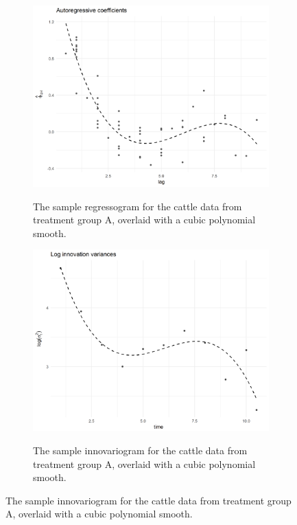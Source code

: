 \documentclass[12pt]{article}
\theoremstyle{definition}
\begin{document}
\begin{figure}[H]
  \begin{subfigure}[t]{0.45\textwidth}
\centering
\includegraphics[width = \textwidth]{img/cattle/cattleA-regressogram-with-cubic-smooth}
\label{fig:cattleA-regressogram-cubic-smooth}
\caption{The sample regressogram for the cattle data from treatment group A, overlaid with a cubic polynomial smooth.}
\end{subfigure}
\hfill
 \begin{subfigure}[t]{0.45\textwidth}
\centering
\includegraphics[width = \textwidth]{img/cattle/cattleA-innovariogram-with-cubic-smooth}
\label{fig:cattleA-innovariogram-cubic-smooth}
\caption{The sample innovariogram for the cattle data from treatment group A, overlaid with a cubic polynomial smooth.}
\end{subfigure} 
\end{figure}
\end{document}
